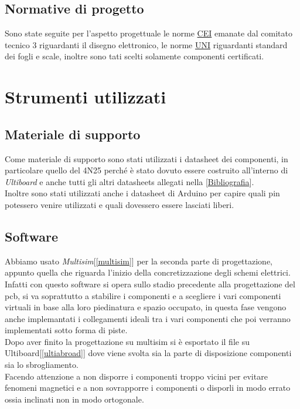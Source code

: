 \documentclass[12pt]{article}
\begin{document}
\subsection{Normative di progetto}
Sono state seguite per l'aspetto progettuale le norme \href{https://my.ceinorme.it/home.html}{CEI} emanate dal comitato tecnico 3 riguardanti il disegno elettronico, le norme \href{https://it.wikipedia.org/wiki/Ente_nazionale_italiano_di_unificazione}{UNI} riguardanti standard dei fogli e scale, inoltre sono tati scelti solamente componenti certificati.\\
\section{Strumenti utilizzati}
\subsection{Materiale di supporto}
Come materiale di supporto sono stati utilizzati i datasheet dei componenti, in particolare quello del 4N25 perché è stato dovuto essere costruito all'interno di \textit{Ultiboard} e anche tutti gli altri datasheets allegati nella  [\hyperref[sec:bibliografia]{Bibliografia}].\\
Inoltre sono stati utilizzati anche i datasheet di Arduino per capire quali pin potessero venire utilizzati e quali dovessero essere lasciati liberi.
\subsection{Software}
Abbiamo usato \textit{Multisim}[\ref{multisim}] per la seconda parte di progettazione, appunto quella che riguarda l'inizio della concretizzazione
degli schemi elettrici.\\
Infatti con questo software si opera sullo stadio precedente alla progettazione del pcb, si va soprattutto a stabilire i componenti e a scegliere i vari componenti virtuali
in base alla loro piedinatura e spazio occupato, in questa fase vengono anche implemantati i collegamenti ideali tra i vari componenti che poi verranno implementati sotto forma di piste.\\
Dopo aver finito la progettazione su multisim si è esportato il file su Ultiboard[\ref{ultiabroad}] dove viene svolta sia la parte di disposizione componenti sia lo sbrogliamento.\\
Facendo attenzione a non disporre i componenti troppo vicini per evitare fenomeni magnetici e a non sovrapporre i componenti o disporli in modo errato ossia inclinati non in modo ortogonale.  
\end{document}
